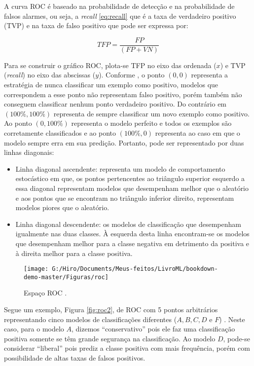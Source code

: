 \documentclass[
  openany]{book}
\begin{document}
A curva ROC é baseado na probabilidade de detecção e na probabilidade de falsos alarmes, ou seja, a \emph{recall} \eqref{eq:recall} que é a taxa de verdadeiro positivo (TVP) e na taxa de falso positivo que pode ser expressa por:

\begin{equation}
TFP=\frac{FP}{(FP+VN)}
\label{eq:TFP}
\end{equation}

Para se construir o gráfico ROC, plota-se TFP no eixo das ordenada (\(x\)) e TVP (\emph{recall}) no eixo das abscissas (\(y\)). Conforme \citep{prati2008curvas}, o ponto \((0,0)\) representa a estratégia de nunca classificar um exemplo como positivo, modelos que correspondem a esse ponto não representam falso positivo, porém também não conseguem classificar nenhum ponto verdadeiro positivo. Do contrário em \((100\%,100\%)\) representa de sempre classificar um novo exemplo como positivo. Ao ponto \((0,100\%)\) representa o modelo perfeito e todos os exemplos são corretamente classificados e ao ponto \((100\%,0)\) representa ao caso em que o modelo sempre erra em sua predição. Portanto, pode ser representado por duas linhas diagonais:

\begin{itemize}
\item
  Linha diagonal ascendente: representa um modelo de comportamento estocástico em que, os pontos pertencentes ao triângulo superior esquerdo a essa diagonal representam modelos que desempenham melhor que o aleatório e aos pontos que se encontram no triângulo inferior direito, representam modelos piores que o aleatório.
\item
  Linha diagonal descendente: os modelos de classificação que desempenham igualmente nas duas classes. À esquerda desta linha encontram-se os modelos que desempenham melhor para a classe negativa em detrimento da positiva e à direita melhor para a classe positiva.
\end{itemize}

\begin{figure}

{\centering \texttt{[image: G:/Hiro/Documents/Meus-feitos/LivroML/bookdown-demo-master/Figuras/roc]} 

}

\caption{Espaço ROC \citep{prati2008curvas}.}\label{fig:roc}
\end{figure}



Segue um exemplo, Figura \ref{fig:roc2}, de ROC com 5 pontos arbitrários representando cinco modelos de classificações diferentes (\(A,B,C,D\) e \(F\)) \citep{prati2008curvas}. Neste caso, para o modelo \(A\), dizemos ``conservativo'' pois ele faz uma classificação positiva somente se têm grande segurança na classificação. Ao modelo \(D\), pode-se considerar ``liberal'' pois prediz a classe positiva com mais frequência, porém com possibilidade de altas taxas de falsos positivos.
\end{document}
